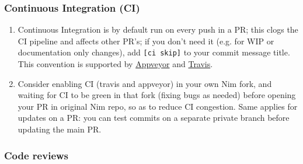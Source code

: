 \hypertarget{continuous-integration-ci}{%
\subsubsection{Continuous Integration
(CI)}\label{continuous-integration-ci}}

\begin{enumerate}
\def\labelenumi{\arabic{enumi}.}
\tightlist
\item
  Continuous Integration is by default run on every push in a PR; this
  clogs the CI pipeline and affects other PR's; if you don't need it
  (e.g. for WIP or documentation only changes), add
  \texttt{{[}ci\ skip{]}} to your commit message title. This convention
  is supported by
  \href{https://www.appveyor.com/docs/how-to/filtering-commits/\#skip-directive-in-commit-message}{Appveyor}
  and
  \href{https://docs.travis-ci.com/user/customizing-the-build/\#skipping-a-build}{Travis}.
\item
  Consider enabling CI (travis and appveyor) in your own Nim fork, and
  waiting for CI to be green in that fork (fixing bugs as needed) before
  opening your PR in original Nim repo, so as to reduce CI congestion.
  Same applies for updates on a PR: you can test commits on a separate
  private branch before updating the main PR.
\end{enumerate}

\hypertarget{code-reviews}{%
\subsubsection{Code reviews}\label{code-reviews}}

